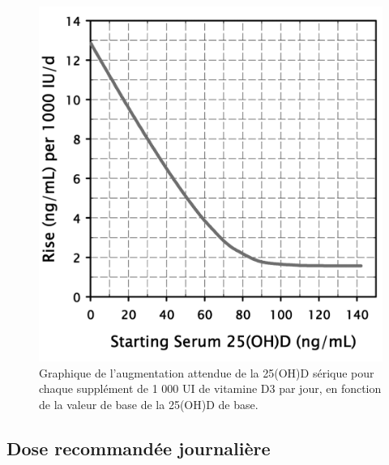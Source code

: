 \documentclass[
  a4paper,
  DIV=11,
  numbers=noendperiod,
  listof=totoc]{scrreprt}
\begin{document}
\begin{figure}
\begin{minipage}[t]{0.50\linewidth}
{{\includegraphics{figures/vd-expected-rise.jpeg}

}

\caption{\label{fig-vd-expected-rise}Graphique de l'augmentation
attendue de la 25(OH)D sérique pour chaque supplément de 1 000 UI de
vitamine D3 par jour, en fonction de la valeur de base de la 25(OH)D de
base. \autocite{Garland.2011}}

}

\end{minipage}%

\end{figure}

\hypertarget{dose-recommanduxe9e-journaliuxe8re}{%
\subsection{Dose recommandée
journalière}\label{dose-recommanduxe9e-journaliuxe8re}}
\end{document}
